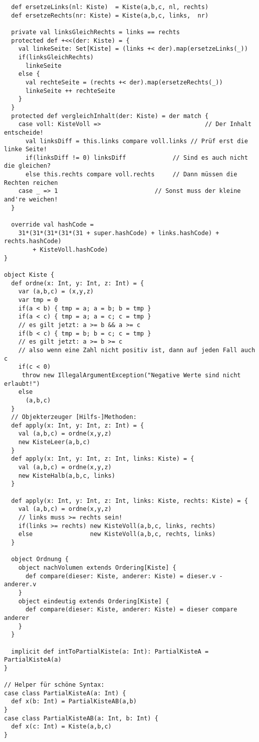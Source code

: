 \begin{lstlisting}
  def ersetzeLinks(nl: Kiste)  = Kiste(a,b,c, nl, rechts)
  def ersetzeRechts(nr: Kiste) = Kiste(a,b,c, links,  nr)

  private val linksGleichRechts = links == rechts
  protected def +<<(der: Kiste) = {
    val linkeSeite: Set[Kiste] = (links +< der).map(ersetzeLinks(_))
    if(linksGleichRechts)
      linkeSeite
    else {
      val rechteSeite = (rechts +< der).map(ersetzeRechts(_))
      linkeSeite ++ rechteSeite
    }
  }
  protected def vergleichInhalt(der: Kiste) = der match {
    case voll: KisteVoll =>                             // Der Inhalt entscheide!
      val linksDiff = this.links compare voll.links // Prüf erst die linke Seite!
      if(linksDiff != 0) linksDiff             // Sind es auch nicht die gleichen?
      else this.rechts compare voll.rechts     // Dann müssen die Rechten reichen
    case _ => 1                           // Sonst muss der kleine and're weichen!
  }

  override val hashCode =
    31*(31*(31*(31*(31 + super.hashCode) + links.hashCode) + rechts.hashCode)
        + KisteVoll.hashCode)
}

object Kiste {
  def ordne(x: Int, y: Int, z: Int) = {
    var (a,b,c) = (x,y,z)
    var tmp = 0
    if(a < b) { tmp = a; a = b; b = tmp }
    if(a < c) { tmp = a; a = c; c = tmp }
    // es gilt jetzt: a >= b && a >= c
    if(b < c) { tmp = b; b = c; c = tmp }
    // es gilt jetzt: a >= b >= c
    // also wenn eine Zahl nicht positiv ist, dann auf jeden Fall auch c
    if(c < 0)
     throw new IllegalArgumentException("Negative Werte sind nicht erlaubt!")
    else
      (a,b,c)
  }
  // Objekterzeuger [Hilfs-]Methoden:
  def apply(x: Int, y: Int, z: Int) = {
    val (a,b,c) = ordne(x,y,z)
    new KisteLeer(a,b,c)
  }
  def apply(x: Int, y: Int, z: Int, links: Kiste) = {
    val (a,b,c) = ordne(x,y,z)
    new KisteHalb(a,b,c, links)
  }
  
  def apply(x: Int, y: Int, z: Int, links: Kiste, rechts: Kiste) = {
    val (a,b,c) = ordne(x,y,z)
    // links muss >= rechts sein!
    if(links >= rechts) new KisteVoll(a,b,c, links, rechts)
    else                new KisteVoll(a,b,c, rechts, links)
  }

  object Ordnung {
    object nachVolumen extends Ordering[Kiste] {
      def compare(dieser: Kiste, anderer: Kiste) = dieser.v - anderer.v
    }
    object eindeutig extends Ordering[Kiste] {
      def compare(dieser: Kiste, anderer: Kiste) = dieser compare anderer
    }
  }

  implicit def intToPartialKiste(a: Int): PartialKisteA = PartialKisteA(a)
}

// Helper für schöne Syntax:
case class PartialKisteA(a: Int) {
  def x(b: Int) = PartialKisteAB(a,b)
}
case class PartialKisteAB(a: Int, b: Int) {
  def x(c: Int) = Kiste(a,b,c)
}
\end{lstlisting}


